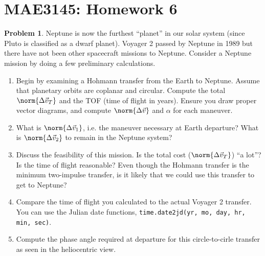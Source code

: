 \documentclass[10pt]{article}
\date{}
\theoremstyle{definition}
\newtheorem{prob}{Problem}[section]
\newenvironment{subprob}%
{\renewcommand{\theenumi}{\alph{enumi}}\renewcommand{\labelenumi}{(\theenumi)}\begin{enumerate}}%
{\end{enumerate}}%
\begin{document}
\setcounter{page}{1}
\pagestyle{plain}
\section*{MAE3145: Homework 6}
\vspace*{-0.4cm}

\begin{prob}
    Neptune is now the furthest ``planet'' in our solar system (since Pluto is classified as a dwarf planet).
    Voyager 2 passed by Neptune in 1989 but there have not been other spacecraft missions to Neptune.
    Consider a Neptune mission by doing a few preliminary calculations. 

    \begin{subprob}
        \item Begin by examining a Hohmann transfer from the Earth to Neptune.
        Assume that planetary orbits are coplanar and circular.
        Compute the total \( \norm{\Delta \vec v_T} \) and the TOF (time of flight in years).
        Ensure you draw proper vector diagrams, and compute \( \norm{\Delta \vec v}\) and \( \alpha \) for each maneuver.
    \item What is \( \norm{\Delta \vec v_1} \), i.e. the maneuver necessary at Earth departure?
        What is \( \norm{\Delta \vec v_2}\) to remain in the Neptune system?
    \item Discuss the feasibility of this mission.
        Is the total cost (\( \norm{\Delta \vec v_T}\)) ``a lot''?
        Is the time of flight reasonable?
        Even though the Hohmann transfer is the minimum two-impulse transfer, is it likely that we could use this transfer to get to Neptune?
    \item Compare the time of flight you calculated to the actual Voyager 2 transfer. 
        You can use the Julian date functions, \texttt{time.date2jd(yr, mo, day, hr, min, sec)}.
    \item Compute the phase angle required at departure for this circle-to-cirle transfer as seen in the heliocentric view.
    \end{subprob}


\end{prob}
\end{document}
